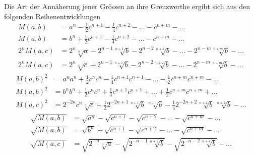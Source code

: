 \documentclass[12pt,a4paper]{article}
\begin{document}
Die Art der Ann\"aherung jener Gr\"ossen an ihre Grenzwerthe ergibt sich aus den folgenden Reihenentwicklungen
\[
\begin{aligned}
M(a,b) &= a^n - \tfrac{1}{2}c^{n+1} - \tfrac{1}{4}c^{n+2} - \dots - c^{n+m} - \dots \\
M(a,b) &= b^n + \tfrac{1}{2}c^{n+1} - \tfrac{1}{4}c^{n+2} - \dots - c^{n+m} - \dots \\
2^n M(a,c) &= 2^n\sqrt[n]{a} - 2^{n-1}\sqrt[n+1]{b} - 2^{n-2}\sqrt[n+2]{b} - \dots - 2^{n-m}\sqrt[n+m]{b} - \dots \\
2^n M(a,c) &= 2^n\sqrt[n]{c} + 2^{n-1}\sqrt[n+1]{b} - 2^{n-2}\sqrt[n+2]{b} - \dots - 2^{n-m}\sqrt[n+m]{b} - \dots
\end{aligned}
\]
\[
\begin{aligned}
M(a,b)^2 &= a^n a^n + \tfrac{1}{2}c^n c^n - \tfrac{1}{4}c^{n+1}c^{n+1} - \dots - \tfrac{1}{2}c^{n+m}c^{n+m} - \dots \\
M(a,b)^2 &= b^n b^n + \tfrac{1}{2}c^n c^n + \tfrac{1}{4}c^{n+1}c^{n+1} + \dots + \tfrac{1}{2}c^{n+m}c^{n+m} + \dots \\
M(a,c)^2 &= 2^{-2n}c^n\sqrt[n]{c} + \tfrac{1}{2}2^{-2n+1}\sqrt[n+1]{b}\,\sqrt[n+1]{b} - \tfrac{1}{4}2^{-2n+2}\sqrt[n+2]{b}\,\sqrt[n+2]{b} - \dots
\end{aligned}
\]
\[
\begin{aligned}
\sqrt{M(a,b)} &= \sqrt{a^n} - \sqrt{c^{n+1}} - \sqrt{c^{n+2}} - \dots - \sqrt{c^{n+m}} - \dots \\
\sqrt{M(a,b)} &= \sqrt{b^n} + \sqrt{c^{n+1}} - \sqrt{c^{n+2}} - \dots - \sqrt{c^{n+m}} - \dots \\
\sqrt{M(a,c)} &= \sqrt{2^{-n}\sqrt[n]{a}} - \sqrt{2^{-n-1}\sqrt[n+2]{b}} - \sqrt{2^{-n-2}\sqrt[n+4]{b}} - \dots
\end{aligned}
\]
\end{document}
